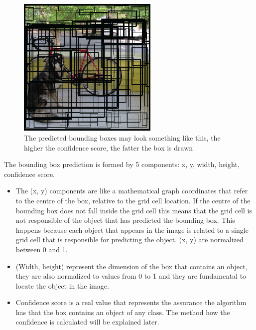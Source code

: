   \begin{figure}[H] %
  \centering
  \includegraphics[width=0.60\textwidth]{figures/paper/yolo-grid-2.png}
  \caption[The predicted bounding boxes]{The predicted bounding boxes may look something like this, the higher the confidence score, the fatter the box is drawn}
  \label{fig:figures/paper/yolo-grid-2}
\end{figure}


The bounding box prediction is formed by 5 components: x, y, width, height, confidence score.

\begin{itemize}
\item The (x, y) components are like a mathematical graph coordinates that refer to the centre
of the box, relative to the grid cell location. If the centre of the bounding box does not
fall inside the grid cell this means that the grid cell is not responsible of the object that
has predicted the bounding box. This happens because each object that appears in the
image is related to a single grid cell that is responsible for predicting the object. (x, y)
are normalized between 0 and 1.

\item (Width,  height)  represent  the  dimension  of  the  box  that  contains  an  object,  they  are
also normalized to values from 0 to 1 and they are fundamental to locate the object in
the image.
\item Confidence score  is  a  real value  that  represents  the assurance  the  algorithm  has  that
the box contains an object of any class. The method how the confidence is calculated
will be explained later.

\end{itemize}


